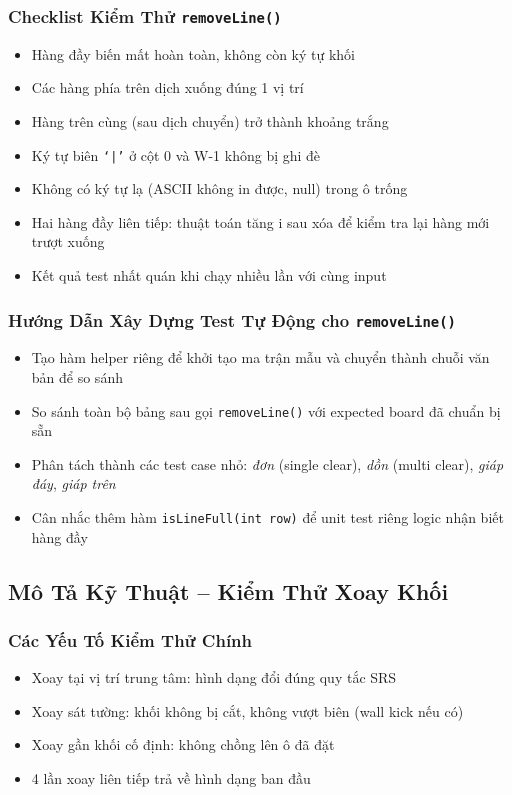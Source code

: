\documentclass[12pt,a4paper]{article}
\begin{document}
\subsubsection{Checklist Kiểm Thử \texttt{removeLine()}}
\begin{itemize}[leftmargin=3em]
  \item Hàng đầy biến mất hoàn toàn, không còn ký tự khối
  \item Các hàng phía trên dịch xuống đúng 1 vị trí
  \item Hàng trên cùng (sau dịch chuyển) trở thành khoảng trắng
  \item Ký tự biên \texttt{`|'} ở cột 0 và W-1 không bị ghi đè
  \item Không có ký tự lạ (ASCII không in được, null) trong ô trống
  \item Hai hàng đầy liên tiếp: thuật toán tăng i sau xóa để kiểm tra lại hàng mới trượt xuống
  \item Kết quả test nhất quán khi chạy nhiều lần với cùng input
\end{itemize}

\subsubsection{Hướng Dẫn Xây Dựng Test Tự Động cho \texttt{removeLine()}}
\begin{itemize}[leftmargin=3em]
  \item Tạo hàm helper riêng để khởi tạo ma trận mẫu và chuyển thành chuỗi văn bản để so sánh
  \item So sánh toàn bộ bảng sau gọi \texttt{removeLine()} với expected board đã chuẩn bị sẵn
  \item Phân tách thành các test case nhỏ: \textit{đơn} (single clear), \textit{dồn} (multi clear), \textit{giáp đáy}, \textit{giáp trên}
  \item Cân nhắc thêm hàm \texttt{isLineFull(int row)} để unit test riêng logic nhận biết hàng đầy
\end{itemize}

\subsection{Mô Tả Kỹ Thuật -- Kiểm Thử Xoay Khối}

\subsubsection{Các Yếu Tố Kiểm Thử Chính}
\begin{itemize}[leftmargin=3em]
  \item Xoay tại vị trí trung tâm: hình dạng đổi đúng quy tắc SRS
  \item Xoay sát tường: khối không bị cắt, không vượt biên (wall kick nếu có)
  \item Xoay gần khối cố định: không chồng lên ô đã đặt
  \item 4 lần xoay liên tiếp trả về hình dạng ban đầu
\end{itemize}
\end{document}
